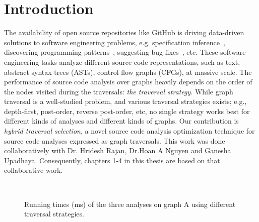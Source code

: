 \chapter{Introduction}
\label{sec:introduction}

The availability of open source repositories like GitHub is driving
data-driven solutions to software engineering problems, e.g.
specification inference~\cite{nguyen2014mining}, discovering programming
patterns~\cite{thummalapenta2009alattin}, suggesting bug
fixes~\cite{livshits2005dynamine,cpminer}, etc.
These software engineering tasks analyze different source code
representations, such as text, abstract syntax trees (ASTs), control
flow graphs (CFGs), at massive scale.
The performance of source code analysis over graphs heavily depends on
the order of the nodes visited during the traversals: {\em the
traversal strategy}. While graph traversal is a well-studied problem,
and various traversal strategies exists; e.g., depth-first,
post-order, reverse post-order, etc, no single strategy works best for
different kinds of analyses and different kinds of graphs.
Our contribution is {\em hybrid traversal selection}, a
novel source code analysis optimization technique for source code
analyses expressed as graph traversals. This work was done collaboratively with Dr. Hridesh Rajan, Dr.Hoan A Nguyen and Ganesha Upadhaya. Consequently, chapters 1-4 in this thesis are based on that collaborative work.

\begin{figure}[t]%
\centering
{}
\\
\caption{Running times (ms) of the three analyses on graph A using different traversal strategies.}
\label{fig:example-a-graph}
\end{figure}

